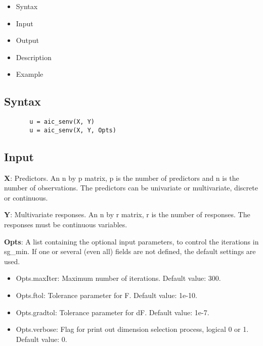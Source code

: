 \documentclass[a4paper,11pt,openany]{memoir}
\begin{document}
\begin{itemize}
\setlength{\itemsep}{-1ex}
   \item Syntax
   \item Input
   \item Output
   \item Description
   \item Example
\end{itemize}


\subsection*{Syntax}


\begin{verbatim}       u = aic_senv(X, Y)
       u = aic_senv(X, Y, Opts)\end{verbatim}
    

\subsection*{Input}

\begin{par}
\textbf{X}: Predictors. An n by p matrix, p is the number of predictors and n is the number of observations. The predictors can be univariate or multivariate, discrete or continuous.
\end{par} \vspace{1em}
\begin{par}
\textbf{Y}: Multivariate responses. An n by r matrix, r is the number of responses. The responses must be continuous variables.
\end{par} \vspace{1em}
\begin{par}
\textbf{Opts}: A list containing the optional input parameters, to control the iterations in sg\_min. If one or several (even all) fields are not defined, the default settings are used.
\end{par} \vspace{1em}
\begin{itemize}
\setlength{\itemsep}{-1ex}
   \item Opts.maxIter: Maximum number of iterations.  Default value: 300.
   \item Opts.ftol: Tolerance parameter for F.  Default value: 1e-10.
   \item Opts.gradtol: Tolerance parameter for dF.  Default value: 1e-7.
   \item Opts.verbose: Flag for print out dimension selection process, logical 0 or 1. Default value: 0.
\end{itemize}
\end{document}

